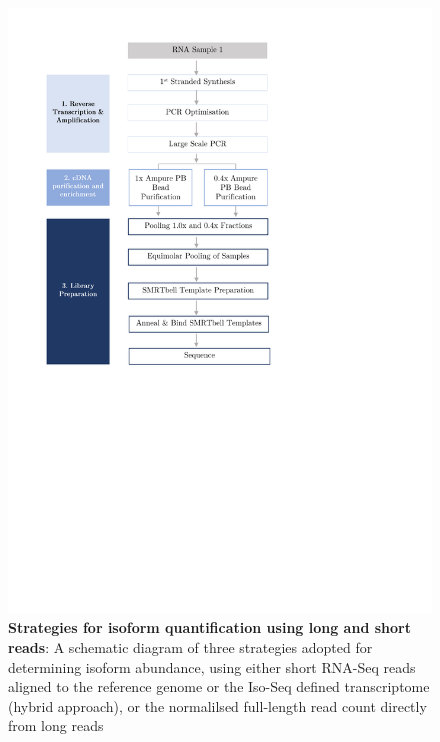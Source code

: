 \begin{figure}[htp]
	\begin{center}
		\includegraphics[page=8,trim={2cm 19cm 0 1cm},clip, scale = 0.8]{Figures/ProjectDevelopment_Figures.pdf}
	\end{center}
	\captionsetup{width=0.95\textwidth}
	\caption[Strategies for isoform quantification]%
	{\textbf{Strategies for isoform quantification using long and short reads}: A schematic diagram of three strategies adopted for determining isoform abundance, using either short RNA-Seq reads aligned to the reference genome or the Iso-Seq defined transcriptome (hybrid approach), or the normalilsed full-length read count directly from long reads}
	\label{fig:isoform_quant_strategy}
\end{figure}


